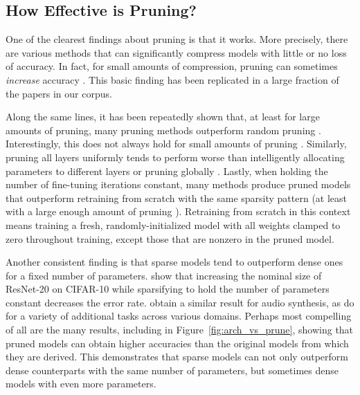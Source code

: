\vspace{-1mm}
\subsection{How Effective is Pruning?}
\vspace{-.25mm}

One of the clearest findings about pruning is that it works. More precisely, there are various methods that can significantly compress models with little or no loss of accuracy. In fact, for small amounts of compression, pruning can sometimes \textit{increase} accuracy \cite{learning-both, spectral-pruning}. This basic finding has been replicated in a large fraction of the papers in our corpus. %

Along the same lines, it has been repeatedly shown that, at least for large amounts of pruning, many pruning methods outperform random pruning \cite{nisp, google-state-of-sparsity, lottery-ticket-followup, divnet, apple-pfa, channel-lasso-lstsq}. Interestingly, this does not always hold for small amounts of pruning \cite{lottery-transfer}. Similarly, pruning all layers uniformly tends to perform worse than intelligently allocating parameters to different layers \cite{google-state-of-sparsity, learning-both, pruning-filters, nvidia-taylor-pruning, thinet-channel-norms} or pruning globally \cite{snip, lottery-ticket}. Lastly, when holding the number of fine-tuning iterations constant, many methods produce pruned models that outperform retraining from scratch with the same sparsity pattern \cite{zhang-accel-very-deep, nisp, bayesian-compression, channel-lasso-lstsq, thinet-channel-norms, lottery-ticket} (at least with a large enough amount of pruning \cite{apple-pfa}). Retraining from scratch in this context means training a fresh, randomly-initialized model with all weights clamped to zero throughout training, except those that are nonzero in the pruned model.

Another consistent finding is that sparse models tend to outperform dense ones for a fixed number of parameters. \citet{snip-followup} show that increasing the nominal size of ResNet-20 on CIFAR-10 while sparsifying to hold the number of parameters constant decreases the error rate. \citet{wavernn} obtain a similar result for audio synthesis, as do \citet{openai-block-sparse} for a variety of additional tasks across various domains. Perhaps most compelling of all are the many results, including in Figure~\ref{fig:arch_vs_prune}, showing that pruned models can obtain higher accuracies than the original models from which they are derived. This demonstrates that sparse models can not only outperform dense counterparts with the same number of parameters, but sometimes dense models with even more parameters.

